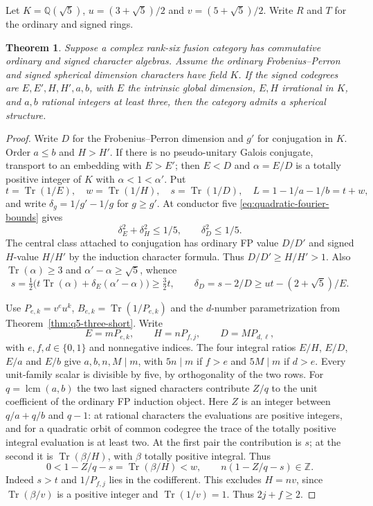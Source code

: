 \documentclass[11pt,reqno]{amsart}
\newtheorem{theorem}{Theorem}[section]
\theoremstyle{remark}\newtheorem{remark}[theorem]{Remark}
\numberwithin{equation}{section}
\begin{document}
Let $K=\mathbb Q(\sqrt5)$, $u=(3+\sqrt5)/2$ and $v=(5+\sqrt5)/2$. Write $R$ and $T$ for the ordinary and signed rings.
\begin{theorem}\label{thm:golden-two-pairs}
Suppose a complex rank-six fusion category has commutative ordinary and signed character algebras. Assume the ordinary Frobenius--Perron and signed spherical dimension characters have field $K$. If the signed codegrees are $E,E',H,H',a,b$, with $E$ the intrinsic global dimension, $E,H$ irrational in $K$, and $a,b$ rational integers at least three, then the category admits a spherical structure.
\end{theorem}
\begin{proof}
Write $D$ for the Frobenius--Perron dimension and $g'$ for conjugation in $K$. Order $a\le b$ and $H>H'$. If there is no pseudo-unitary Galois conjugate, transport to an embedding with $E>E'$; then $E<D$ and $\alpha=E/D$ is a totally positive integer of $K$ with $\alpha<1<\alpha'$. Put
\[
 t=\operatorname{Tr}(1/E),\quad w=\operatorname{Tr}(1/H),\quad s=\operatorname{Tr}(1/D),\quad L=1-1/a-1/b=t+w,
\]
and write $\delta_g=1/g'-1/g$ for $g\ge g'$. At conductor five \eqref{eq:quadratic-fourier-bounds} gives
\begin{equation}\label{eq:two-golden-fourier}
 \delta_E^2+\delta_H^2\le 1/5,\qquad \delta_D^2\le1/5.
\end{equation}
The central class attached to conjugation has ordinary FP value $D/D'$ and signed $H$-value $H/H'$ by the induction character formula. Thus $D/D'\ge H/H'>1$. Also $\operatorname{Tr}(\alpha)\ge3$ and $\alpha'-\alpha\ge\sqrt5$, whence
\begin{equation}\label{eq:two-golden-rearrange}
 s=\tfrac12\big(t\operatorname{Tr}(\alpha)+\delta_E(\alpha'-\alpha)\big)\ge\tfrac32 t,
 \qquad \delta_D=s-2/D\ge ut-(2+\sqrt5)/E.
\end{equation}

Use $P_{e,k}=v^e u^k$, $B_{e,k}=\operatorname{Tr}(1/P_{e,k})$ and the $d$-number parametrization from Theorem~\ref{thm:q5-three-short}. Write
\[
 E=mP_{e,k},\qquad H=nP_{f,j},\qquad D=MP_{d,\ell},
\]
with $e,f,d\in\{0,1\}$ and nonnegative indices. The four integral ratios $E/H$, $E/D$, $E/a$ and $E/b$ give $a,b,n,M\mid m$, with $5n\mid m$ if $f>e$ and $5M\mid m$ if $d>e$. Every unit-family scalar is divisible by five, by orthogonality of the two rows. For $q=\operatorname{lcm}(a,b)$ the two last signed characters contribute $Z/q$ to the unit coefficient of the ordinary FP induction object. Here $Z$ is an integer between $q/a+q/b$ and $q-1$: at rational characters the evaluations are positive integers, and for a quadratic orbit of common codegree the trace of the totally positive integral evaluation is at least two. At the first pair the contribution is $s$; at the second it is $\operatorname{Tr}(\beta/H)$, with $\beta$ totally positive integral. Thus
\begin{equation}\label{eq:two-golden-column}
 0<1-Z/q-s=\operatorname{Tr}(\beta/H)<w,\qquad n(1-Z/q-s)\in\mathbb Z.
\end{equation}
Indeed $s>t$ and $1/P_{f,j}$ lies in the codifferent. This excludes $H=nv$, since $\operatorname{Tr}(\beta/v)$ is a positive integer and $\operatorname{Tr}(1/v)=1$. Thus $2j+f\ge2$.


\end{proof}
\end{document}
